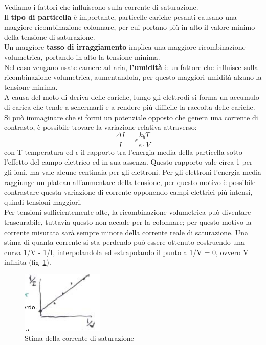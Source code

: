 Vediamo i fattori che influiscono sulla corrente di saturazione.\\
Il \textbf{tipo di particella} \`e importante, particelle cariche pesanti causano una maggiore ricombinazione colonnare, per cui portano pi\`u in alto il valore
minimo della tensione di saturazione.\\
Un maggiore \textbf{tasso di irraggiamento} implica una maggiore ricombinazione volumetrica, portando in alto la tensione minima.\\
Nel caso vengano usate camere ad aria,\textbf{ l'umidit\`a }\`e un fattore che influisce sulla ricombinazione volumetrica, aumentandola, per questo maggiori umidit\`a
alzano la tensione minima.\\
A causa del moto di deriva delle cariche, lungo gli elettrodi si forma un accumulo di carica che tende a schermarli e a rendere pi\`u difficile la raccolta delle cariche.
Si pu\`o immaginare che si formi un potenziale opposto che genera una corrente di contrasto, \`e possibile trovare la variazione relativa attraverso:
\begin{equation*}
\frac{\Delta I}{I} = \epsilon \frac{k_b T}{e\cdot V}
\end{equation*}
con T temperatura ed $\epsilon$ il rapporto tra l'energia media della particella sotto l'effetto del campo elettrico ed in sua assenza.
Questo rapporto vale circa 1 per gli ioni, ma vale alcune centinaia per gli elettroni.
Per gli elettroni l'energia media raggiunge un plateau all'aumentare della tensione, per questo motivo \`e possibile contrastare questa variazione
di corrente opponendo campi elettrici pi\`u intensi, quindi tensioni maggiori.\\
Per tensioni sufficientemente alte, la ricombinazione volumetrica pu\`o diventare trascurabile, tuttavia questo non accade per la colonnare;
per questo motivo la corrente misurata sar\`a sempre minore della corrente reale di saturazione.
Una stima di quanta corrente si sta perdendo pu\`o essere ottenuto costruendo una curva 1/V - 1/I, interpolandola ed estrapolando il punto a 1/V = 0, ovvero
V infinita (fig~\ref{fig:iPersa}).
\begin{figure}[htbp]
\begin{center}
\includegraphics[scale=1]{./Immagini/IPersa.png}
\caption{Stima della corrente di saturazione}
\label{fig:iPersa}
\end{center}
\end{figure}
